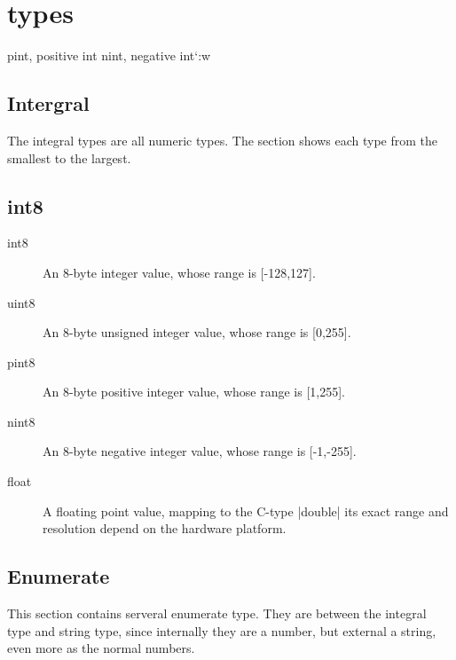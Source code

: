 \chapter{types}
\label{chapter:types}


pint, positive int
nint, negative int`:w

\section{Intergral}
\label{section:types:integral}

The integral types are all numeric types. The section shows each type from
the smallest to the largest.

\section{int8}
\label{type:int8}

\begin{description}
\item[int8]\label{type:int8}
	An \mbox{$8$-byte} integer value, whose range is [-128,127].

\item[uint8]\label{type:uint8}
	An \mbox{$8$-byte} unsigned integer value, whose range is [0,255].

\item[pint8]\label{type:pint8}
	An \mbox{$8$-byte} positive integer value, whose range is [1,255].

\item[nint8]\label{type:nint8}
	An \mbox{$8$-byte} negative integer value, whose range is [-1,-255].



\item[float]\label{float}
	A floating point value, mapping to the C-type \command|double| its exact
	range and resolution depend on the hardware platform.

\end{description}


\section{Enumerate}
\label{type:enumerate}

This section contains serveral enumerate type. They are between the integral
type and string type, since internally they are a number, but external a
string, even more as the normal numbers.


